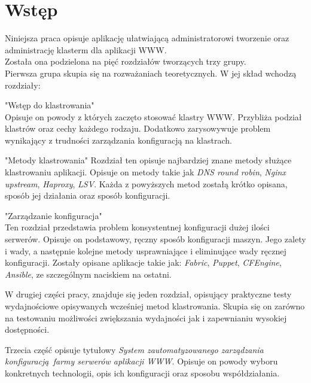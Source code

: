 \chapter*{Wstęp}
Niniejsza praca opisuje aplikację ułatwiającą administratorowi tworzenie oraz administrację klasterm dla aplikacji WWW.\\
Została ona podzielona na pięć rozdziałów tworzących trzy grupy.\\
Pierwsza grupa skupia się na rozważaniach teoretycznych.
W jej skład wchodzą rozdziały:
\begin{description}
\item{"Wstęp do klastrowania"}\\
Opisuje on powody z których zaczęto stosować klastry WWW.
Przybliża podział klastrów oraz cechy każdego rodzaju.
Dodatkowo zarysowywuje problem wynikający z trudności zarządzania konfiguracją na klastrach.
\item{"Metody klastrowania"}
Rozdział ten opisuje najbardziej znane metody służące klastrowaniu aplikacji.
Opisuje on metody takie jak \textit{DNS round robin}, \textit{Nginx upstream}, \textit{Haproxy}, \textit{LSV}.
Każda z powyższych metod zostałą krótko opisana, sposób jej działania oraz sposób konfiguracji.
\item{"Zarządzanie konfiguracja"}\\
Ten rozdział przedstawia problem konsystentnej konfiguracji dużej ilości serwerów.
Opisuje on podstawowy, ręczny sposób konfiguracji maszyn.
Jego zalety i wady, a następnie kolejne metody usprawniające i eliminujące wady ręcznej konfiguracji.
Zostały opisane aplikacje takie jak: \textit{Fabric}, \textit{Puppet}, \textit{CFEngine}, \textit{Ansible}, ze szczególnym naciskiem na ostatni.
\end{description}

W drugiej części pracy, znajduje się jeden rozdział, opisujący praktyczne testy wydajnościowe opisywanych wcześniej metod klastrowania.
Skupia się on zarówno na testowaniu możliwości zwiększania wydajności jak i zapewnianiu wysokiej dostępności.

Trzecia część opisuje tytułowy \textit{System zautomatyzowanego zarządzania konfiguracją farmy serwerów aplikacji WWW}.
Opisuje on powody wyboru konkretnych technologii, opis ich konfiguracji oraz sposobu współdziałania.
